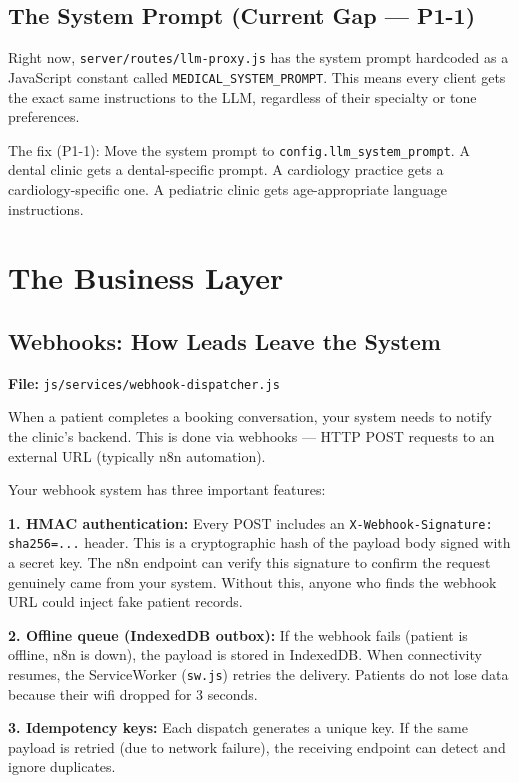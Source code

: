 \documentclass[12pt, a4paper]{report}
\newcommand{\ic}[1]{\texttt{\small\color{accentblue!70!black}#1}}
\begin{document}
\section{The System Prompt (Current Gap --- P1-1)}

Right now, \ic{server/routes/llm-proxy.js} has the system prompt hardcoded as a
JavaScript constant called \ic{MEDICAL\_SYSTEM\_PROMPT}. This means every client gets
the exact same instructions to the LLM, regardless of their specialty or tone
preferences.

The fix (P1-1): Move the system prompt to \ic{config.llm\_system\_prompt}. A dental
clinic gets a dental-specific prompt. A cardiology practice gets a cardiology-specific
one. A pediatric clinic gets age-appropriate language instructions.

\chapter{The Business Layer}

\section{Webhooks: How Leads Leave the System}

\textbf{File:} \ic{js/services/webhook-dispatcher.js}

When a patient completes a booking conversation, your system needs to notify the clinic's
backend. This is done via webhooks --- HTTP POST requests to an external URL (typically
n8n automation).

Your webhook system has three important features:

\textbf{1. HMAC authentication:} Every POST includes an
\ic{X-Webhook-Signature: sha256=...} header. This is a cryptographic hash of the payload
body signed with a secret key. The n8n endpoint can verify this signature to confirm the
request genuinely came from your system. Without this, anyone who finds the webhook URL
could inject fake patient records.

\textbf{2. Offline queue (IndexedDB outbox):} If the webhook fails (patient is offline,
n8n is down), the payload is stored in IndexedDB. When connectivity resumes, the
ServiceWorker (\ic{sw.js}) retries the delivery. Patients do not lose data because their
wifi dropped for 3 seconds.

\textbf{3. Idempotency keys:} Each dispatch generates a unique key. If the same payload
is retried (due to network failure), the receiving endpoint can detect and ignore
duplicates.
\end{document}
